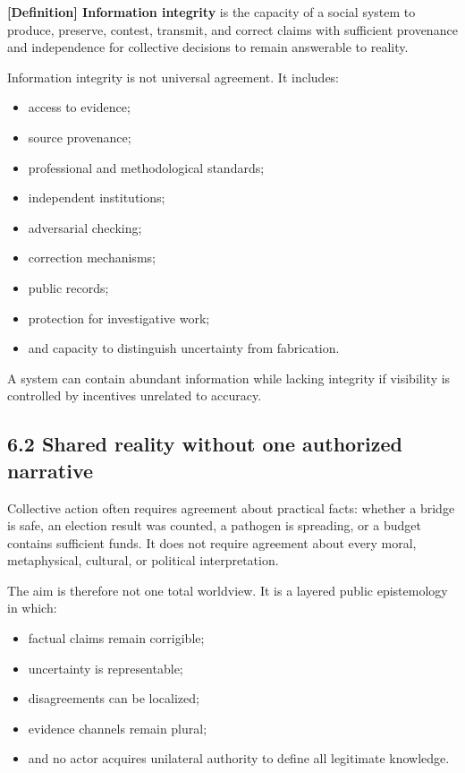 \documentclass[
  11pt,
]{article}
\providecommand{\tightlist}{%
  \setlength{\itemsep}{0pt}\setlength{\parskip}{0pt}}
\begin{document}
\textbf{{[}Definition{]} Information integrity} is the capacity of a
social system to produce, preserve, contest, transmit, and correct
claims with sufficient provenance and independence for collective
decisions to remain answerable to reality.

Information integrity is not universal agreement. It includes:

\begin{itemize}
\tightlist
\item
  access to evidence;
\item
  source provenance;
\item
  professional and methodological standards;
\item
  independent institutions;
\item
  adversarial checking;
\item
  correction mechanisms;
\item
  public records;
\item
  protection for investigative work;
\item
  and capacity to distinguish uncertainty from fabrication.
\end{itemize}

A system can contain abundant information while lacking integrity if
visibility is controlled by incentives unrelated to accuracy.

\subsection{6.2 Shared reality without one authorized
narrative}\label{shared-reality-without-one-authorized-narrative}

Collective action often requires agreement about practical facts:
whether a bridge is safe, an election result was counted, a pathogen is
spreading, or a budget contains sufficient funds. It does not require
agreement about every moral, metaphysical, cultural, or political
interpretation.

The aim is therefore not one total worldview. It is a layered public
epistemology in which:

\begin{itemize}
\tightlist
\item
  factual claims remain corrigible;
\item
  uncertainty is representable;
\item
  disagreements can be localized;
\item
  evidence channels remain plural;
\item
  and no actor acquires unilateral authority to define all legitimate
  knowledge.
\end{itemize}
\end{document}
